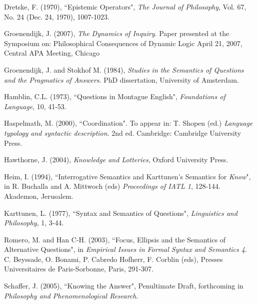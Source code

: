 \begin{thebibliography}{99}


 Dretske, F. (1970), ``Epistemic Operators", \emph{The Journal of Philosophy},
Vol. 67, No. 24 (Dec. 24, 1970), 1007-1023.

 Groenendijk, J.  (2007), \emph{The Dynamics of Inquiry}. 
Paper presented at the Symposium on:
Philosophical Consequences of Dynamic Logic
April 21, 2007, Central APA Meeting, Chicago

 Groenendijk, J. and Stokhof M. (1984), \emph{Studies
in the Semantics of Questions and the Pragmatics of Answers}. PhD
dissertation, University of Amsterdam.

 Hamblin, C.L. (1973), ``Questions in Montague
English", \emph{Foundations of Language}, 10, 41-53.

 Haspelmath, M. (2000),  
``Coordination". To appear in: T. Shopen (ed.) \emph{Language typology and syntactic description}. 2nd ed. Cambridge: Cambridge University Press. 

 Hawthorne, J. (2004), \emph{Knowledge and
Lotteries}, Oxford University Press.

 Heim, I. (1994), ``Interrogative Semantics and Karttunen's
Semantics for \emph{Know}", in R. Buchalla and A. Mittwoch (eds)
\emph{Proceedings of IATL 1}, 128-144. Akademon, Jerusalem.

 Karttunen, L. (1977), ``Syntax and Semantics of
Questions", \emph{Linguistics and Philosophy}, 1, 3-44.

 Romero, M. and Han C-H. (2003), ``Focus, Ellipsis and
the Semantics of Alternative Questions", in \emph{Empirical Issues
in Formal Syntax and Semantics 4}. C. Beyssade, O. Bonami, P.
Cabredo Hofherr, F. Corblin (eds), Presses Universitaires de
Paris-Sorbonne, Paris, 291-307.

 Schaffer, J. (2005), ``Knowing the Answer",
Penultimate Draft, forthcoming in \emph{Philosophy and
Phenomenological Research}.


\end{thebibliography}
